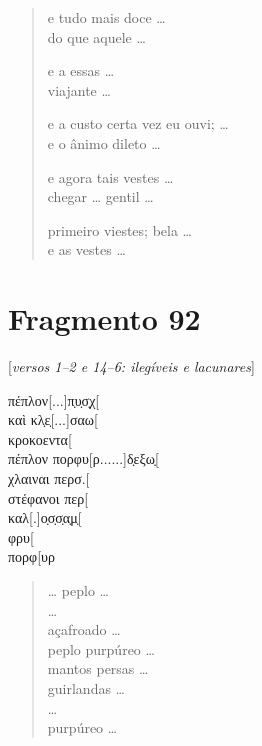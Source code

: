 {\begin{verse}
e tudo mais doce \ldots{}\\
do que aquele \ldots{}

e a essas \ldots{}\\
viajante \ldots{}

e a custo certa vez eu ouvi; \ldots{}\\
e o ânimo dileto \ldots{}

e agora tais vestes \ldots{}\\ 
chegar \ldots{} gentil \ldots{}

primeiro viestes; bela \ldots{}\\ \EP[1]
e as vestes \ldots{}
\end{verse}

\medskip



\section{Fragmento 92} 

\begin{gkverse}
\textnormal{[\textit{versos 1--2 e 14--6: ilegíveis e lacunares}]}

πέπλον[...]π̣υ̣σ̣χ[\\
καὶ κλ̣ε̣[...]σαω[\\
κροκοεντα[\\
πέπλον πορφυ[ρ......]δ̣εξω̣[\\
χλαιναι περσ.[\\
στέφανοι περ[\\
καλ[.]ο̣σ̣σ̣α̣μ̣[\\
φρυ[\\
πορφ[υρ
\end{gkverse}

\begin{verse}
\ldots{} peplo \ldots{}\\ 
\ldots{}\\
açafroado \ldots{}\\
peplo purpúreo \ldots{}\\
mantos persas \ldots{}\\
guirlandas \ldots{}\\
\ldots{}\\
purpúreo \ldots{}
\end{verse}

}

